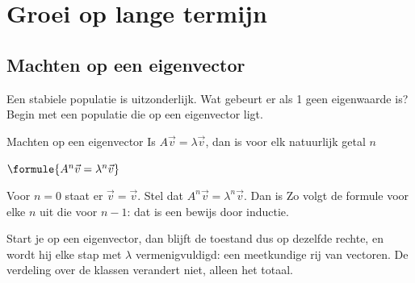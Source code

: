 \section{Groei op lange termijn}

\subsection{Machten op een eigenvector}

Een stabiele populatie is uitzonderlijk. Wat gebeurt er als 1 geen eigenwaarde is? Begin met een populatie die op een eigenvector ligt.

\begin{theorie}
\begin{stelling}{Machten op een eigenvector}
Is $A\vec v = \lambda\vec v$, dan is voor elk natuurlijk getal $n$

\vspace{1mm}
\qquad $\formule{A^n\vec v = \lambda^n\vec v}$
\end{stelling}

\begin{bewijs}
Voor $n = 0$ staat er $\vec v = \vec v$. Stel dat $A^n\vec v = \lambda^n\vec v$. Dan is
Zo volgt de formule voor elke $n$ uit die voor $n - 1$: dat is een bewijs door inductie.
\end{bewijs}
\end{theorie}

Start je op een eigenvector, dan blijft de toestand dus op dezelfde rechte, en wordt hij elke stap met $\lambda$ vermenigvuldigd: een meetkundige rij van vectoren. De verdeling over de klassen verandert niet, alleen het totaal.



